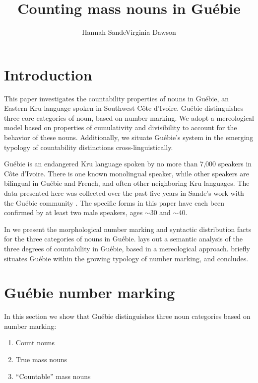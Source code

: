 \documentclass[output=paper,colorlinks,citecolor=brown]{langscibook}
\title{Counting mass nouns in Guébie}
\author{Hannah Sande\affiliation{Georgetown University}\lastand Virginia Dawson\affiliation{University of California, Berkeley}}
\begin{document}
\maketitle 

\section{Introduction}\label{sec:sande:1}

This paper investigates the countability properties of nouns in Guébie, an Eastern Kru language spoken in Southwest Côte d'Ivoire. Guébie distinguishes three core categories of noun, based on number marking. We adopt a mereological model based on properties of cumulativity and divisibility to account for the behavior of these nouns. Additionally, we situate Guébie's system in the emerging typology of countability distinctions cross-linguistically.

Guébie is an endangered Kru language spoken by no more than 7,000 speakers in Côte d'Ivoire. There is one known monolingual speaker, while other speakers are bilingual in Guébie and French, and often other neighboring Kru languages. The data presented here was collected over the past five years in Sande's work with the Guébie community \citep{Sande2017}. The specific forms in this paper have each been confirmed by at least two male speakers, ages $\sim$30 and $\sim$40.

In  we present the morphological number marking and syntactic distribution facts for the three categories of nouns in Guébie.  lays out a semantic analysis of the three degrees of countability in Guébie, based in a mereological approach.  briefly situates Guébie within the growing typology of number marking, and  concludes.

\section{Guébie number marking}\label{sec:sande:2}

In this section we show that Guébie distinguishes three noun categories based on number marking:

\begin{enumerate}
	\item Count nouns
	\item True mass nouns
	\item ``Countable'' mass nouns
\end{enumerate}
\end{document}
